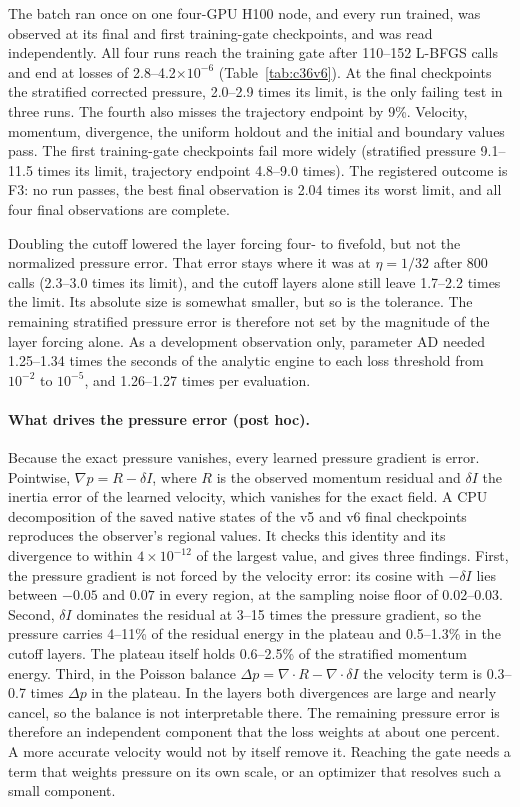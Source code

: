 \documentclass[11pt]{article}
\begin{document}
The batch ran once on one four-GPU H100 node, and every run trained, was
observed at its final and first training-gate checkpoints, and was read
independently. All four runs reach the training gate after 110--152 L-BFGS
calls and end at losses of 2.8--4.2$\times10^{-6}$
(Table~\ref{tab:c36v6}). At the final checkpoints the stratified corrected
pressure, 2.0--2.9 times its limit, is the only failing test in three runs.
The fourth also misses the trajectory endpoint by 9\%. Velocity, momentum,
divergence, the uniform holdout and the initial and boundary values pass.
The first training-gate checkpoints fail more widely (stratified pressure
9.1--11.5 times its limit, trajectory endpoint 4.8--9.0 times). The
registered outcome is F3: no run passes, the best final observation is 2.04
times its worst limit, and all four final observations are complete.

Doubling the cutoff lowered the layer forcing four- to fivefold, but not
the normalized pressure error. That error stays where it was at
$\eta=1/32$ after 800 calls (2.3--3.0 times its limit), and the cutoff
layers alone still leave 1.7--2.2 times the limit. Its absolute size is
somewhat smaller, but so is the tolerance. The remaining stratified pressure
error is therefore not set by the magnitude of the layer forcing alone. As a
development observation only, parameter AD needed 1.25--1.34 times the
seconds of the analytic engine to each loss threshold from $10^{-2}$ to
$10^{-5}$, and 1.26--1.27 times per evaluation.

\paragraph{What drives the pressure error (post hoc).}
Because the exact pressure vanishes, every learned pressure gradient is
error. Pointwise, $\nabla p = R - \delta I$, where $R$ is the observed
momentum residual and $\delta I$ the inertia error of the learned velocity,
which vanishes for the exact field. A CPU decomposition of the saved native
states of the v5 and v6 final checkpoints reproduces the observer's
regional values. It checks this identity and its divergence to within
$4\times10^{-12}$ of the largest value, and gives three findings. First,
the pressure gradient is not forced by the velocity error: its cosine with
$-\delta I$ lies between $-0.05$ and $0.07$ in every region, at the sampling
noise floor of 0.02--0.03. Second, $\delta I$ dominates the residual at 3--15
times the pressure gradient, so the pressure carries 4--11\% of the residual
energy in the plateau and 0.5--1.3\% in the cutoff layers. The plateau
itself holds 0.6--2.5\% of the stratified momentum energy. Third, in the
Poisson balance $\Delta p = \nabla\cdot R - \nabla\cdot\delta I$ the velocity
term is 0.3--0.7 times $\Delta p$ in the plateau. In the layers both
divergences are large and nearly cancel, so the balance is not
interpretable there. The remaining pressure error is therefore an
independent component that the loss weights at about one percent. A more
accurate velocity would not by itself remove it. Reaching the gate needs a
term that weights pressure on its own scale, or an optimizer that resolves
such a small component.
\end{document}
